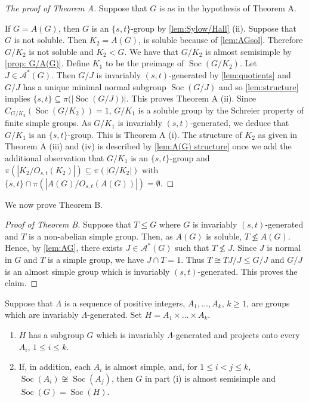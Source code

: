 \documentclass[12pt,a4paper]{amsart}
\DeclareMathOperator{\Soc}{Soc}
\begin{document}
\begin{proof}[The proof of Theorem A] Suppose that $G$ is as in the hypothesis of Theorem A.

If $G=A(G)$, then $G$ is an $\{s,t\}$-group by \cref{lem:Sylow/Hall} (ii). Suppose that $G$ is not soluble. Then $ K_2=A(G)$, is soluble because of  \cref{lem:AGsol}. Therefore   $G/K_2$ is not soluble and $K_2<G$. We have that $G/K_2$ is almost semisimple by \cref{prop: G/A(G)}.
Define $K_1$ to be the preimage of $\Soc(G/K_2)$. Let $J\in \mathcal A^*(G)$. Then $G/J$ is invariably $(s,t)$-generated  by \cref{lem:quotients} and $G/J$ has a unique minimal normal subgroup $\Soc(G/J)$ and so \cref{lem:structure} implies $\{s,t\} \subseteq \pi(|\Soc(G/J))|$. This proves Theorem A (ii).
Since $C_{G/K_2}(\Soc(G/K_2))=1$, $G/K_1$ is a soluble group by the Schreier property of finite simple groups. As $G/K_1$ is invariably $(s,t)$-generated, we deduce that $G/K_1$ is an $\{s,t\}$-group. This is Theorem A (i).  The structure of $K_2$ as given in Theorem A (iii) and (iv) is   described by \cref{lem:A(G) structure} once we add the additional observation that $G/K_1$ is an $\{s,t\}$-group and $\pi(|K_2/O_{s,t}(K_2)|)\subseteq \pi(|G/K_2|)$ with $\{s,t\} \cap \pi(|A(G)/O_{s,t}(A(G))|)=\emptyset$.
\end{proof}


We now prove Theorem B.

\begin{proof}[Proof of Theorem B] Suppose that $T \le G$ where $G$ is invariably $(s,t)$-generated and $T$ is a non-abelian simple group. Then, as $A(G)$ is soluble, $T\not \le A(G)$.  Hence, by \cref{lem:AG}, there exists $J \in \mathcal A^*(G)$ such that $T \not \le J$.  Since $J$ is normal in $G$ and $T$ is a simple group, we have $J \cap T=1$. Thus $T \cong TJ/J \le G/J$ and $G/J$ is an almost simple group which is invariably $(s,t)$-generated. This proves the claim.
 \end{proof}




\begin{proposition}\label{lem:dif socles} Suppose that $\Lambda$ is a  sequence of positive integers, $A_1, \dots, A_k$, $k\ge 1$, are   groups which are invariably $\Lambda$-generated. Set $H=A_1\times \dots\times A_k$.
\begin{enumerate}
\item $H$ has  a subgroup $G$ which is invariably $\Lambda$-generated and projects onto every $A_i$, $1\le i \le k$.
\item If, in addition, each $A_i$ is almost simple, and, for $1\le i<j\le k$, $ \Soc(A_i) \not \cong \Soc(A_j)$, then $G$ in part (i) is almost semisimple and  $\Soc(G)=\Soc(H)$.
\end{enumerate}
\end{proposition}
\end{document}
